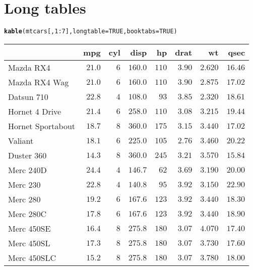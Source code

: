 \documentclass{article}\usepackage[]{graphicx}\usepackage[]{color}
\makeatletter
\newcommand{\hlnum}[1]{\textcolor[rgb]{0.686,0.059,0.569}{#1}}%
\newcommand{\hlopt}[1]{\textcolor[rgb]{0,0,0}{#1}}%
\newcommand{\hlstd}[1]{\textcolor[rgb]{0.345,0.345,0.345}{#1}}%
\newcommand{\hlkwc}[1]{\textcolor[rgb]{0.333,0.667,0.333}{#1}}%
\newcommand{\hlkwd}[1]{\textcolor[rgb]{0.737,0.353,0.396}{\textbf{#1}}}%
\newenvironment{kframe}{%
 \def\at@end@of@kframe{}%
 \ifinner\ifhmode%
  \def\at@end@of@kframe{\end{minipage}}%
  \begin{minipage}{\columnwidth}%
 \fi\fi%
 \def\FrameCommand##1{\hskip\@totalleftmargin \hskip-\fboxsep
 \colorbox{shadecolor}{##1}\hskip-\fboxsep
     \hskip-\linewidth \hskip-\@totalleftmargin \hskip\columnwidth}%
 \MakeFramed {\advance\hsize-\width
   \@totalleftmargin\z@ \linewidth\hsize
   \@setminipage}}%
 {\par\unskip\endMakeFramed%
 \at@end@of@kframe}
\makeatother
\begin{document}
\section{Long tables}

\begin{kframe}
\begin{alltt}
\hlkwd{kable}\hlstd{(mtcars[,} \hlnum{1}\hlopt{:}\hlnum{7}\hlstd{],} \hlkwc{longtable} \hlstd{=} \hlnum{TRUE}\hlstd{,} \hlkwc{booktabs} \hlstd{=} \hlnum{TRUE}\hlstd{)}
\end{alltt}
\end{kframe}
\begin{longtable}{lrrrrrrr}
\toprule{}
  & mpg & cyl & disp & hp & drat & wt & qsec\\
\midrule{}
Mazda RX4 & \(21.0\) & \(6\) & \(160.0\) & \(110\) & \(3.90\) & \(2.620\) & \(16.46\)\\
Mazda RX4 Wag & \(21.0\) & \(6\) & \(160.0\) & \(110\) & \(3.90\) & \(2.875\) & \(17.02\)\\
Datsun 710 & \(22.8\) & \(4\) & \(108.0\) & \(93\) & \(3.85\) & \(2.320\) & \(18.61\)\\
Hornet 4 Drive & \(21.4\) & \(6\) & \(258.0\) & \(110\) & \(3.08\) & \(3.215\) & \(19.44\)\\
Hornet Sportabout & \(18.7\) & \(8\) & \(360.0\) & \(175\) & \(3.15\) & \(3.440\) & \(17.02\)\\
\addlinespace
Valiant & \(18.1\) & \(6\) & \(225.0\) & \(105\) & \(2.76\) & \(3.460\) & \(20.22\)\\
Duster 360 & \(14.3\) & \(8\) & \(360.0\) & \(245\) & \(3.21\) & \(3.570\) & \(15.84\)\\
Merc 240D & \(24.4\) & \(4\) & \(146.7\) & \(62\) & \(3.69\) & \(3.190\) & \(20.00\)\\
Merc 230 & \(22.8\) & \(4\) & \(140.8\) & \(95\) & \(3.92\) & \(3.150\) & \(22.90\)\\
Merc 280 & \(19.2\) & \(6\) & \(167.6\) & \(123\) & \(3.92\) & \(3.440\) & \(18.30\)\\
\addlinespace
Merc 280C & \(17.8\) & \(6\) & \(167.6\) & \(123\) & \(3.92\) & \(3.440\) & \(18.90\)\\
Merc 450SE & \(16.4\) & \(8\) & \(275.8\) & \(180\) & \(3.07\) & \(4.070\) & \(17.40\)\\
Merc 450SL & \(17.3\) & \(8\) & \(275.8\) & \(180\) & \(3.07\) & \(3.730\) & \(17.60\)\\
Merc 450SLC & \(15.2\) & \(8\) & \(275.8\) & \(180\) & \(3.07\) & \(3.780\) & \(18.00\)\\

\end{longtable}
\end{document}
